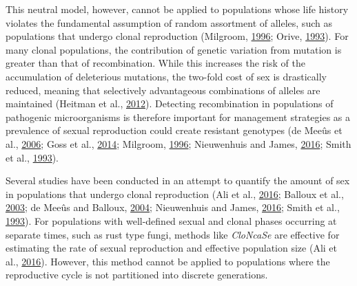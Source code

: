 \documentclass[double,12pt]{beavtex}
\begin{document}
  This neutral model, however, cannot be applied to populations whose life
  history violates the fundamental assumption of random assortment of
  alleles, such as populations that undergo clonal reproduction (Milgroom,
  \protect\hyperlink{ref-milgroom1996recombination}{1996}; Orive,
  \protect\hyperlink{ref-orive1993effective}{1993}). For many clonal
  populations, the contribution of genetic variation from mutation is
  greater than that of recombination. While this increases the risk of the
  accumulation of deleterious mutations, the two-fold cost of sex is
  drastically reduced, meaning that selectively advantageous combinations
  of alleles are maintained (Heitman et al.,
  \protect\hyperlink{ref-heitman2012evolution}{2012}). Detecting
  recombination in populations of pathogenic microorganisms is therefore
  important for management strategies as a prevalence of sexual
  reproduction could create resistant genotypes (de Meeûs et al.,
  \protect\hyperlink{ref-de2006molecular}{2006}; Goss et al.,
  \protect\hyperlink{ref-goss2014irish}{2014}; Milgroom,
  \protect\hyperlink{ref-milgroom1996recombination}{1996}; Nieuwenhuis and
  James, \protect\hyperlink{ref-nieuwenhuis2016frequency}{2016}; Smith et
  al., \protect\hyperlink{ref-smith1993how}{1993}).
  
  Several studies have been conducted in an attempt to quantify the amount
  of sex in populations that undergo clonal reproduction (Ali et al.,
  \protect\hyperlink{ref-ali2016cloncase}{2016}; Balloux et al.,
  \protect\hyperlink{ref-balloux2003population}{2003}; de Meeûs and
  Balloux, \protect\hyperlink{ref-de2004clonal}{2004}; Nieuwenhuis and
  James, \protect\hyperlink{ref-nieuwenhuis2016frequency}{2016}; Smith et
  al., \protect\hyperlink{ref-smith1993how}{1993}). For populations with
  well-defined sexual and clonal phases occurring at separate times, such
  as rust type fungi, methods like \emph{CloNcaSe} are effective for
  estimating the rate of sexual reproduction and effective population size
  (Ali et al., \protect\hyperlink{ref-ali2016cloncase}{2016}). However,
  this method cannot be applied to populations where the reproductive
  cycle is not partitioned into discrete generations.
  
\end{document}
